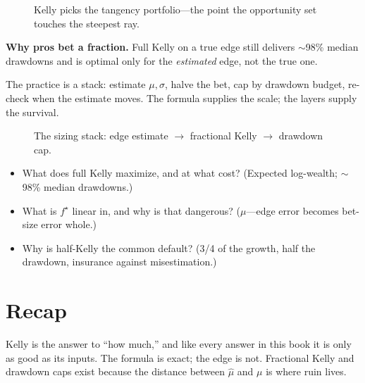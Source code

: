 \begin{figure}[htbp]\centering

\caption{Kelly picks the tangency portfolio---the point the opportunity set touches the
steepest ray.}
\label{fig:frontier}
\end{figure}

\begin{example}\label{ex:kalloc}
\textbf{Why pros bet a fraction.} Full Kelly on a true edge still delivers $\sim$98\%
median drawdowns and is optimal only for the \emph{estimated} edge, not the true one.
\begin{solution}
The practice is a stack: estimate $\mu,\sigma$, halve the bet, cap by drawdown budget,
re-check when the estimate moves. The formula supplies the scale; the layers supply
the survival.
\end{solution}
\end{example}

\begin{figure}[htbp]\centering

\caption{The sizing stack: edge estimate $\to$ fractional Kelly $\to$ drawdown cap.}
\label{fig:decide}
\end{figure}

\begin{checkpoint}
\begin{itemize}
\item What does full Kelly maximize, and at what cost? (Expected log-wealth; $\sim$98\%
median drawdowns.)
\item What is $f^\star$ linear in, and why is that dangerous? ($\mu$---edge error becomes
bet-size error whole.)
\item Why is half-Kelly the common default? (3/4 of the growth, half the drawdown,
insurance against misestimation.)
\end{itemize}
\end{checkpoint}

\section{Recap}\label{sec:krecap}

Kelly is the answer to ``how much,'' and like every answer in this book it is only as
good as its inputs. The formula is exact; the edge is not. Fractional Kelly and drawdown
caps exist because the distance between $\hat\mu$ and $\mu$ is where ruin lives.

